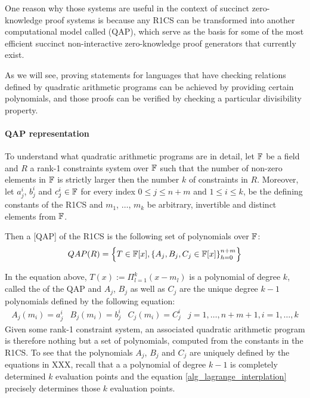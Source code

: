 One reason why those systems are useful in the context of succinct zero-knowledge proof systems is because any R1CS can be transformed into another computational model called  (QAP), which serve as the basis for some of the most efficient succinct non-interactive zero-knowledge proof generators that currently exist. 

As we will see, proving statements for languages that have checking relations defined by quadratic arithmetic programs can be achieved by providing certain polynomials, and those proofs can be verified by checking a particular divisibility property. 
\paragraph{QAP representation} To understand what quadratic arithmetic programs are in detail, let $\mathbb{F}$ be a field and $R$ a rank-1 constraints system over $\mathbb{F}$ such that the number of non-zero elements in $\mathbb{F}$ is strictly larger then the number $k$ of constraints in $R$. Moreover, let $a_j^i$, $b_j^i$ and $c_j^i\in\mathbb{F}$ for every index $0\leq j \leq n+m$ and $1\leq i \leq k$, be the defining constants of the R1CS and $m_1$, $\ldots$, $m_k$ be arbitrary, invertible and distinct elements from $\mathbb{F}$.
  
Then a  [QAP] of the R1CS is the following set of polynomials over $\mathbb{F}$:
\begin{equation}
QAP(R) = \left\{T\in \mathbb{F}[x],\left\{A_j,B_j,C_j\in \mathbb{F}[x]\right\}_{h=0}^{n+m}\right\}
\end{equation}

In the equation above, $T(x) := \Pi_{l=1}^k (x- m_l)$ is a polynomial of degree $k$, called the  of the QAP and $A_j$, $B_j$ as well as $C_j$ are the unique degree $k-1$ polynomials defined by the following equation:
\begin{equation}
\begin{array}{lllr}
A_j(m_i)=a_j^i & B_j(m_i)=b_j^i & C_j(m_i)=C_j^i & j= 1, \ldots , n+m+1, i=1,\ldots,k 
\end{array}
\end{equation}
Given some rank-1 constraint system, an associated quadratic arithmetic program is therefore nothing but a set of polynomials, computed from the constants in the R1CS. To see that the polynomials $A_j$, $B_j$ and $C_j$ are uniquely defined by the equations in XXX, recall that a a polynomial of degree $k-1$ is completely determined  $k$ evaluation points and the equation \ref{alg_lagrange_interplation} precisely determines those $k$ evaluation points.

